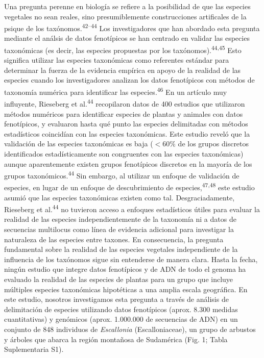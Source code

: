 \documentclass[
  11pt,
]{article}
\begin{document}
Una pregunta perenne en biología se refiere a la posibilidad de que las especies vegetales no sean reales, sino presumiblemente construcciones artificales de la psique de los taxónomos.\textsuperscript{42--44} Los investigadores que han abordado esta pregunta mediante el análsis de datos fenotípicos se han centrado en validar las especies taxonómicas (es decir, las especies propuestas por los taxónomos).\textsuperscript{44,45} Esto significa utilizar las especies taxonómicas como referentes estándar para determinar la fuerza de la evidencia empírica en apoyo de la realidad de las especies cuando los investigadores analizan los datos fenotípicos con métodos de taxonomía numérica para identificar las especies.\textsuperscript{46} En un artículo muy influyente, Rieseberg et al.\textsuperscript{44} recopilaron datos de 400 estudios que utilizaron métodos numéricos para identificar especies de plantas y animales con datos fenotípicos, y evaluaron hasta qué punto las especies delimitadas con métodos estadísticos coincidían con las especies taxonómicas. Este estudio reveló que la validación de las especies taxonómicas es baja (\(< 60\%\) de los grupos discretos identificados estadísticamente son congruentes con las especies taxonómicas) aunque aparentemente existen grupos fenotípicos discretos en la mayoría de los grupos taxonómicos.\textsuperscript{44} Sin embargo, al utilizar un enfoque de validación de especies, en lugar de un enfoque de descubrimiento de especies,\textsuperscript{47,48} este estudio asumió que las especies taxonómicas existen como tal. Desgraciadamente, Rieseberg et al.\textsuperscript{44} no tuvieron acceso a enfoques estadísticos útiles para evaluar la realidad de las especies independientemente de la taxonomía ni a datos de secuencias multilocus como línea de evidencia adicional para investigar la naturaleza de las especies entre taxones. En consecuencia, la pregunta fundamental sobre la realidad de las especies vegetales independiente de la influencia de los taxónomos sigue sin entenderse de manera clara. Hasta la fecha, ningún estudio que integre datos fenotípicos y de ADN de todo el genoma ha evaluado la realidad de las especies de plantas para un grupo que incluye múltiples especies taxonómicas hipotéticas a una amplia escala geográfica. En este estudio, nosotros investigamos esta pregunta a través de análisis de delimitación de especies utilizando datos fenotípicos (aprox. 8.300 medidas cuantitativas) y genómicos (aprox. 1.000.000 de secuencias de ADN) en un conjunto de 848 individuos de \emph{Escallonia} (Escalloniaceae), un grupo de arbustos y árboles que abarca la región montañosa de Sudamérica (Fig. 1; Tabla Suplementaria S1).
\end{document}
